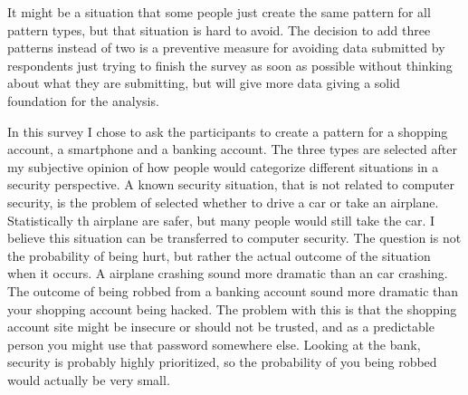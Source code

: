       It might be a situation that some people just create the same pattern for all pattern types, but that situation is hard to avoid. The decision to add three patterns instead of two is a preventive measure for avoiding data submitted by respondents just trying to finish the survey as soon as possible without thinking about what they are submitting, but will give more data giving a solid foundation for the analysis. 

      In this survey I chose to ask the participants to create a pattern for a shopping account, a smartphone and a banking account. The three types are selected after my subjective opinion of how people would categorize different situations in a security perspective. A known security situation, that is not related to computer security, is the problem of selected whether to drive a car or take an airplane. Statistically th airplane are safer, but many people would still take the car. I believe this situation can be transferred to computer security. The question is not the probability of being hurt, but rather the actual outcome of the situation when it occurs. A airplane crashing sound more dramatic than an car crashing. The outcome of being robbed from a banking account sound more dramatic than your shopping account being hacked. The problem with this is that the shopping account site might be insecure or should not be trusted, and as a predictable person you might use that password somewhere else. Looking at the bank, security is probably highly prioritized, so the probability of you being robbed would actually be very small. 

